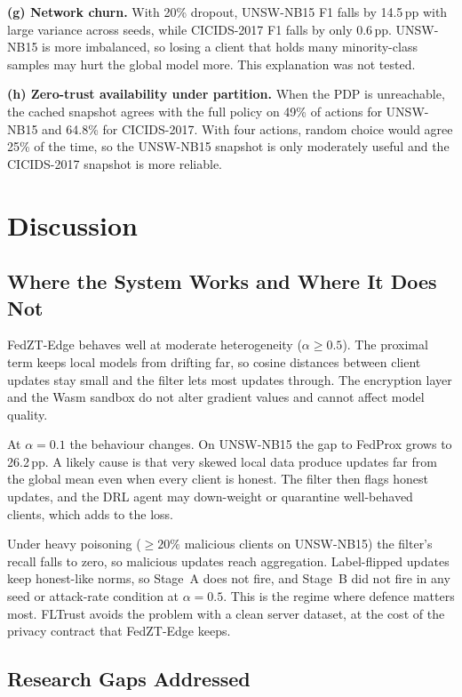 \documentclass[iicol,Numbered]{sn-jnl}
\begin{document}
\textbf{(g) Network churn.} With 20\% dropout, UNSW-NB15 F1 falls by 14.5\,pp
with large variance across seeds, while CICIDS-2017 F1 falls by only 0.6\,pp.
UNSW-NB15 is more imbalanced, so losing a client that holds many minority-class
samples may hurt the global model more. This explanation was not tested.

\textbf{(h) Zero-trust availability under partition.} When the PDP is
unreachable, the cached snapshot agrees with the full policy on 49\% of actions
for UNSW-NB15 and 64.8\% for CICIDS-2017. With four actions, random choice would
agree 25\% of the time, so the UNSW-NB15 snapshot is only moderately useful and
the CICIDS-2017 snapshot is more reliable.

\section{Discussion}\label{sec:discussion}

\subsection{Where the System Works and Where It Does Not}

FedZT-Edge behaves well at moderate heterogeneity ($\alpha\ge0.5$). The proximal
term keeps local models from drifting far, so cosine distances between client
updates stay small and the filter lets most updates through. The encryption layer
and the Wasm sandbox do not alter gradient values and cannot affect model
quality.

At $\alpha=0.1$ the behaviour changes. On UNSW-NB15 the gap to FedProx grows to
26.2\,pp. A likely cause is that very skewed local data produce updates far from
the global mean even when every client is honest. The filter then flags honest
updates, and the DRL agent may down-weight or quarantine well-behaved clients,
which adds to the loss.

Under heavy poisoning ($\ge20\%$ malicious clients on UNSW-NB15) the filter's
recall falls to zero, so malicious updates reach aggregation. Label-flipped
updates keep honest-like norms, so Stage~A does not fire, and Stage~B did not
fire in any seed or attack-rate condition at $\alpha=0.5$. This is the regime
where defence matters most. FLTrust avoids the problem with a clean server
dataset, at the cost of the privacy contract that FedZT-Edge keeps.

\subsection{Research Gaps Addressed}
\end{document}
